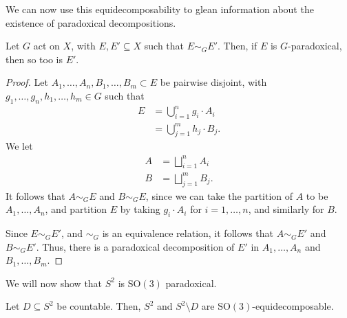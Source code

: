 \documentclass[10pt]{mypackage2}
\begin{document}
We can now use this equidecomposability to glean information about the existence of paradoxical decompositions.
\begin{proposition}
  Let $G$ act on $X$, with $E,E'\subseteq X$ such that $E\sim_{G}E'$. Then, if $E$ is $G$-paradoxical, then so too is $E'$.
\end{proposition}

\begin{proof}
Let $A_1,\dots,A_n,B_1,\dots,B_m\subset E$ be pairwise disjoint, with $g_1,\dots,g_n,h_1,\dots,h_m\in G$ such that
\begin{align*}
  E &= \bigcup_{i=1}^{n}g_i\cdot A_i\\
    &= \bigcup_{j=1}^{m}h_j\cdot B_j.
\end{align*}
We let
\begin{align*}
  A &= \bigsqcup_{i=1}^{n}A_i\\
  B &= \bigsqcup_{j=1}^{m}B_j.
\end{align*}
It follows that $A\sim_{G}E$ and $B\sim_{G}E$, since we can take the partition of $A$ to be $A_1,\dots,A_n$, and partition $E$ by taking $g_i\cdot A_i$ for $i=1,\dots,n$, and similarly for $B$.\newline

Since $E\sim_{G}E'$, and $\sim_{G}$ is an equivalence relation, it follows that $A\sim_{G}E'$ and $B\sim_{G}E'$. Thus, there is a paradoxical decomposition of $E'$ in $A_1,\dots,A_n$ and $B_1,\dots,B_m$.
\end{proof}

We will now show that $S^{2}$ is $\text{SO}(3)$ paradoxical.
\begin{proposition}
  Let $D\subseteq S^{2}$ be countable. Then, $S^{2}$ and $S^{2}\setminus D$ are $\text{SO}(3)$-equidecomposable.
\end{proposition}
\end{document}
